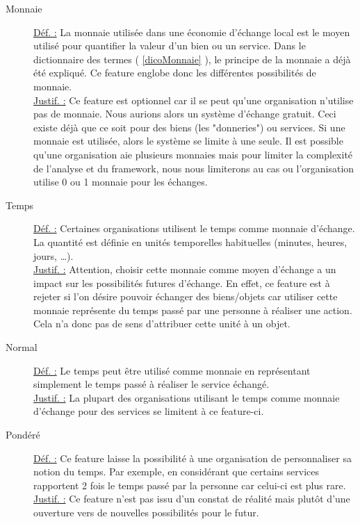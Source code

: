 \begin{description}
\item [Monnaie]
\underline{Déf. :}  La monnaie utilisée dans une économie d'échange local est le moyen utilisé pour quantifier la valeur d'un bien ou un service.  Dans le dictionnaire des termes ( \ref{dicoMonnaie} ),  le principe de la monnaie a déjà été expliqué.   Ce feature englobe donc les différentes possibilités de monnaie.
\\ \underline{Justif. :}  Ce feature est optionnel car il se peut qu'une organisation n'utilise pas de monnaie.  Nous aurions alors un système d'échange gratuit.  Ceci existe déjà que ce soit pour des biens (les "donneries") ou services.  Si une monnaie est utilisée,  alors le système se limite à une seule.  Il est possible qu'une organisation aie plusieurs monnaies mais pour limiter la complexité de l'analyse et du framework,  nous nous limiterons au cas ou l'organisation utilise 0 ou 1 monnaie pour les échanges.
\newline

\item [Temps]
\underline{Déf. :}  Certaines organisations utilisent le temps comme monnaie d'échange.  La quantité est définie en unités temporelles habituelles (minutes,  heures,  jours, \dots ).  
\\ \underline{Justif. :}  Attention,  choisir cette monnaie comme moyen d'échange a un impact sur les possibilités futures d'échange.  En effet,  ce feature est à rejeter si l'on désire pouvoir échanger des biens/objets car utiliser cette monnaie représente du temps passé par une personne à réaliser une action.  Cela n'a donc pas de sens d'attribuer cette unité à un objet.
\newline

\item [Normal]
\underline{Déf. :}  Le temps peut être utilisé comme monnaie en représentant simplement le temps passé à réaliser le service échangé.
\\ \underline{Justif. :}  La plupart des organisations utilisant le temps comme monnaie d'échange pour des services se limitent à ce feature-ci.
\newline

\item [Pondéré]
\underline{Déf. :}  Ce feature laisse la possibilité à une organisation de personnaliser sa notion du temps.  Par exemple,  en considérant que certains services rapportent 2 fois le temps passé par la personne car celui-ci est plus rare.  
\\ \underline{Justif. :}  Ce feature n'est pas issu d'un constat de réalité mais plutôt d'une ouverture vers de nouvelles possibilités pour le futur.
\newline


\end{description}
